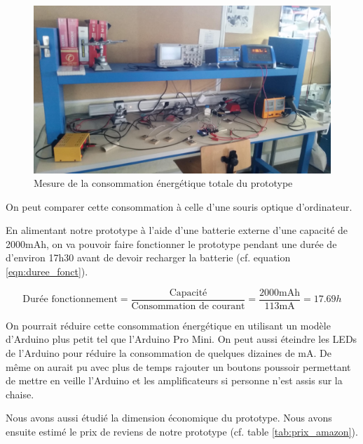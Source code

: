 \documentclass{polytech/polytech}
\begin{document}
\begin{figure}[htbp]
\begin{center}
\includegraphics[width=12cm]{image/mesure_de_consommation2}
\end{center}
\caption{Mesure de la consommation énergétique totale du prototype}
\label{fig:mesure_amper_tot}
\end{figure}

On peut comparer cette consommation à celle d'une souris optique d'ordinateur.

En alimentant notre prototype à l'aide d'une batterie externe d'une capacité de 2000mAh, on va pouvoir faire fonctionner le prototype pendant une durée de d'environ 17h30 avant de devoir recharger la batterie (cf. equation \eqref{eqn:duree_fonct}).

\begin{equation}
\label{eqn:duree_fonct}
\text{Durée fonctionnement}
=
\frac{\text{Capacité}}
{\text{Consommation de courant}}
= \frac{2000\text{mAh}}{113\text{mA}}
=17.69 h
\end{equation}


On pourrait réduire cette consommation énergétique en utilisant un modèle d'Arduino plus petit tel que l'Arduino Pro Mini. 
On peut aussi éteindre les LEDs de l'Arduino pour réduire la consommation de quelques dizaines de mA.
De même on aurait pu avec plus de temps rajouter un boutons poussoir permettant de mettre en veille l'Arduino et les amplificateurs si personne n'est assis sur la chaise.

Nous avons aussi étudié la dimension économique du prototype. 
Nous avons ensuite estimé le prix de reviens de notre prototype (cf. table \ref{tab:prix_amazon}). 
\end{document}
